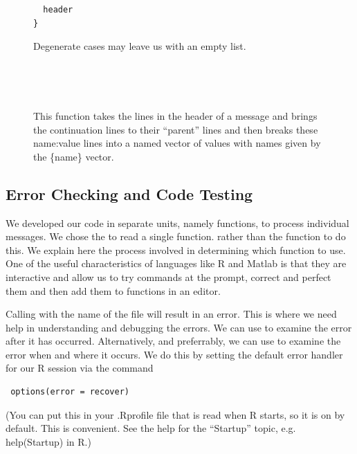 \begin{figure}
\begin{minipage}{15cm}
\begin{minipage}[t]{9cm}
\begin{verbatim}
  header
}
\end{verbatim}
\end{minipage}
\begin{minipage}[t]{6cm}
{\footnotesize{
Degenerate cases may leave us with an empty list.
}}
\\
\end{minipage}
\\
\end{minipage}
\\
\caption{This function takes the lines in the header of a message and 
  brings the continuation lines to their ``parent'' 
  lines and then breaks these name:value
  lines into a named vector of values with names given 
  by the \{name\} vector.}
\end{figure}

\subsection{Error Checking and Code Testing }
We developed our code in separate units, namely functions, 
to process individual messages. 
We chose the  to read a single function.
rather than the  function to do this.  
We explain here the process involved in determining 
which function to use.
One of the useful characteristics of languages like R and Matlab is
that they are interactive and allow us to try commands at the prompt,
correct and perfect them and then add them to functions in an editor.

Calling   with the name of the file
will result in an error.  This is where we need help in understanding
and debugging the errors.  We can use
 to examine the error after it
has occurred.  Alternatively, and preferrably, we can use
 to examine the error when and where it
occurs.
We do this by setting the default error handler for our
R session via the command
\begin{verbatim}
 options(error = recover)
\end{verbatim}
(You can put this in your .Rprofile file that is read when R starts, so it is
on by default. This is convenient.  See the help
for the ``Startup'' topic, e.g. help(Startup) in R.) 

